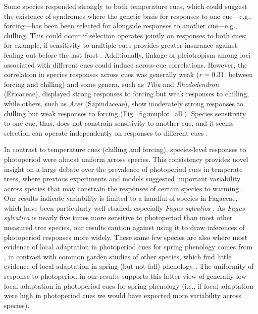 \documentclass[11pt]{article}
\begin{document}
Some species responded strongly to both temperature cues, which could suggest the existence of syndromes where the genetic basis for responses to one cue---e.g.,  forcing---has been been selected for alongside responses to another cue---e.g., chilling. This could occur if selection operates jointly on responses to both cues; for example, if sensitivity to multiple cues provides greater insurance against leafing out before the last frost \citep{bonamour2019,memegan2021}. Additionally, linkage or pleiotropism among loci associated with different cues \citep{nakagawa2005} could induce across-cue correlations. However, the correlation in species responses across cues was generally weak (\emph{r} = 0.31; between forcing and chilling) and some genera, such as \emph{Tilia} and \emph{Rhododendron} (Ericaceae), displayed strong responses to forcing but weak responses to chilling, while others, such as \emph{Acer} (Sapindaceae), show moderately strong responses to chilling but weak responses to forcing (Fig. \ref{fig:muplot_all}). Species sensitivity to one cue, thus, does not constrain sensitivity to another cue, and it seems selection can operate independently on responses to different cues \citep{bonamour2019}.

In contrast to temperature cues (chilling and forcing), species-level responses to photoperiod were almost uniform across species. This consistency provides novel insight on a large debate over the prevalence of photoperiod cues in temperate trees, where previous experiments \citep{Basler:2012,zohner2016} and models \citep[e.g.,][]{Hunter:1992jw,schaber20203} suggested important variability across species that may constrain the responses of certain species to warming \citep{way2015}. Our results indicate variability is limited to a handful of species in Fagaceae, which have been particularly well studied, especially \emph{Fagus sylvatica} \citep[e.g.,][]{Basler:2012,zohner2016,kramer2017}. As \emph{Fagus sylvatica} is nearly five times more sensitive to photoperiod than most other measured tree species, our results caution against using it to draw inferences of photoperiod responses more widely. These same few species are also where most evidence of local adaptation in photoperiod cues for spring phenology comes from \citep[e.g.,][]{kramer2017}, in contrast with common garden studies of other species, which find little evidence of local adaptation in spring (but not fall) phenology \citep{aitken2016}. The uniformity of response to photoperiod in our results supports this latter view of generally low local adaptation in photoperiod cues for spring phenology (i.e., if local adaptation were high in photoperiod cues we would have expected more variability across species). %
\end{document}
